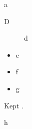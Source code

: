 \documentclass{article}
\begin{document}
\begin{list}{}{}
\item[\unhbox0] a
\end{list}
\renewcommand\descriptionlabel[1]{\hspace\labelsep\textbf{#1}}
\begin{description}\item[D] d\end{description}
\begin{itemize}
\item[\hskip10pt\hskip\labelsep P] e
\item[(f)\hspace{\labelsep}] f
\end{itemize}
\sbox{}
\begin{itemize}\item[\usebox\keep] g\end{itemize}
Kept \usebox\keep.
\begin{trivlist}\item[\hskip\labelsep\bfseries Thm.] h\end{trivlist}
\end{document}
